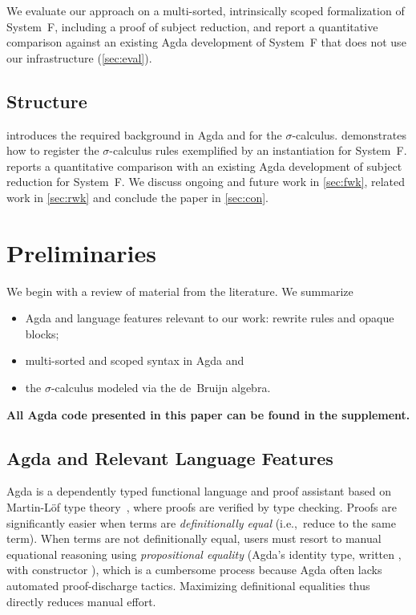 \documentclass[a4paper,UKenglish,cleveref, autoref, thm-restate,anonymous]{lipics-v2021}
\begin{document}
We evaluate our approach on a multi-sorted, intrinsically scoped formalization
of System~F, including a proof of subject reduction, and report a quantitative
comparison against an existing Agda development of System~F that does not use
our infrastructure (\cref{sec:eval}).

\subsection*{Structure}

 introduces the required background in Agda and for the
$σ$-calculus.  demonstrates how to register the $σ$-calculus rules
exemplified by an instantiation for System~F.  reports a
quantitative comparison with an existing Agda development of subject reduction
for System~F. We discuss ongoing and future work in \cref{sec:fwk},
related work in \cref{sec:rwk}
and conclude the paper in \cref{sec:con}.

\section{Preliminaries}\label{sec:pre}
We begin with a review of material from the literature. We summarize
\begin{itemize}
      \item Agda and language features relevant to our work: rewrite rules and opaque
            blocks;
      \item multi-sorted and scoped syntax in Agda and
      \item the $σ$-calculus modeled via the de~Bruijn algebra.
\end{itemize}

\noindent\textbf{All Agda code presented in this paper can be found in the supplement.}

\subsection{Agda and Relevant Language Features}\label{sec:pre-agd}
Agda is a dependently typed functional language and proof assistant based on
Martin-Löf type theory~\cite{MARTINLOF197573}, where proofs are verified by
type checking. Proofs are significantly easier when terms are
\textit{definitionally equal} (i.e.,\ reduce to the same term). When terms are
not definitionally equal, users must resort to manual equational reasoning
using \textit{propositional equality} (Agda's identity type, written
, with constructor ), which
is a cumbersome process because Agda often lacks
automated proof-discharge tactics. Maximizing definitional equalities thus
directly reduces manual effort.
\end{document}
